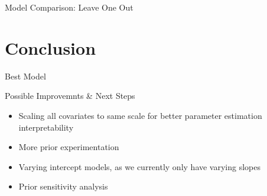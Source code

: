 \documentclass{beamer}
\begin{document}
\begin{frame}{Model Comparison: Leave One Out}
    \begin{table}[!htbp] \centering 
        \caption{Model comparison with LOO statistics} 
        \label{} 
      
      \end{table}


      \begin{table}[!htbp] \centering 
        \caption{Model comparison with LOO statistics, Moment Matching} 
        
      
      \end{table}

\end{frame}



\section{Conclusion}

\begin{frame}{Best Model}
\end{frame}



\begin{frame}{Possible Improvemnts & Next Steps}
    \begin{itemize}
        \item Scaling all covariates to same scale for better parameter estimation interpretability
        \item More prior experimentation 
        \item Varying intercept models, as we currently only have varying slopes
        \item Prior sensitivity analysis     
    \end{itemize}
\end{frame}
\end{document}
